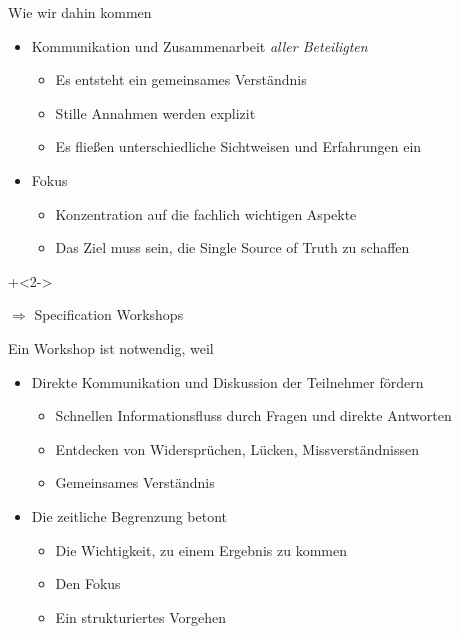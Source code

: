 \begin{frame}{Wie wir dahin kommen}

\begin{itemize}
	\item Kommunikation und Zusammenarbeit \em aller \em Beteiligten 
	\begin{itemize}
		\item Es entsteht ein gemeinsames Verständnis
		\item Stille Annahmen werden explizit
		\item Es fließen unterschiedliche Sichtweisen und Erfahrungen ein
	\end{itemize}
	
	\item Fokus
	\begin{itemize}
		\item Konzentration auf die fachlich wichtigen Aspekte
		\item Das Ziel muss sein, die Single Source of Truth zu schaffen
	\end{itemize}
\end{itemize}

\onslide+<2->
	
$\Rightarrow$ Specification Workshops

\end{frame}


\begin{frame}{Ein Workshop ist notwendig, weil}

\begin{itemize}
	\item Direkte Kommunikation und Diskussion der Teilnehmer fördern
	\begin{itemize}
		\item Schnellen Informationsfluss durch Fragen und direkte Antworten
		\item Entdecken von Widersprüchen, Lücken, Missverständnissen
		\item Gemeinsames Verständnis
	\end{itemize}

	\item Die zeitliche Begrenzung betont
	\begin{itemize}
		\item Die Wichtigkeit, zu einem Ergebnis zu kommen
		\item Den Fokus
		\item Ein strukturiertes Vorgehen
	\end{itemize}
\end{itemize}

\end{frame}



